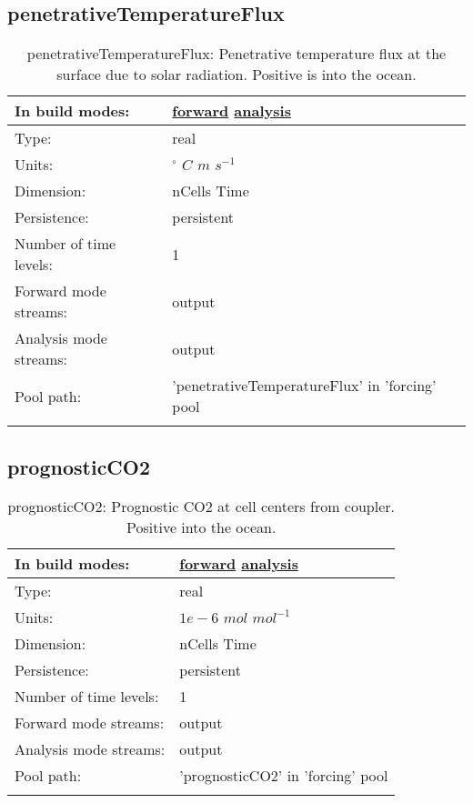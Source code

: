 \subsection[penetrativeTemperatureFlux]{penetrativeTemperatureFlux}
\label{subsec:var_sec_forcing_penetrativeTemperatureFlux}
\begin{center}
\begin{longtable}{| p{2.0in} | p{4.0in} |}
        \hline 
        In build modes: & \hyperref[subsec:forward_var_tab_forcing]{forward} \hyperref[subsec:analysis_var_tab_forcing]{analysis} \\
        \hline 
        Type: & real \\
        \hline 
        Units: & $^\circ$ $C$ $m$ $s^{-1}$ \\
        \hline 
        Dimension: & nCells Time \\
        \hline 
        Persistence: & persistent \\
        \hline 
        Number of time levels: & 1 \\
        \hline 
		 Forward mode streams: &  output \\
        \hline 
		 Analysis mode streams: &  output \\
        \hline 
            Pool path: & 'penetrativeTemperatureFlux' in 'forcing' pool
 \\
		 \hline 
    \caption{penetrativeTemperatureFlux: Penetrative temperature flux at the surface due to solar radiation. Positive is into the ocean.}
\end{longtable}
\end{center}
\subsection[prognosticCO2]{prognosticCO2}
\label{subsec:var_sec_forcing_prognosticCO2}
\begin{center}
\begin{longtable}{| p{2.0in} | p{4.0in} |}
        \hline 
        In build modes: & \hyperref[subsec:forward_var_tab_forcing]{forward} \hyperref[subsec:analysis_var_tab_forcing]{analysis} \\
        \hline 
        Type: & real \\
        \hline 
        Units: & $1e-6$ $mol$ $mol^{-1}$ \\
        \hline 
        Dimension: & nCells Time \\
        \hline 
        Persistence: & persistent \\
        \hline 
        Number of time levels: & 1 \\
        \hline 
		 Forward mode streams: &  output \\
        \hline 
		 Analysis mode streams: &  output \\
        \hline 
            Pool path: & 'prognosticCO2' in 'forcing' pool
 \\
		 \hline 
    \caption{prognosticCO2: Prognostic CO2 at cell centers from coupler. Positive into the ocean.}
\end{longtable}
\end{center}

